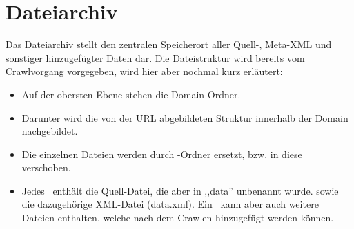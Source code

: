 \section{Dateiarchiv} \label{spec:filearchive}
Das Dateiarchiv stellt den zentralen Speicherort aller Quell-, Meta-XML und sonstiger
hinzugefügter Daten dar.
Die Dateistruktur wird bereits vom Crawlvorgang vorgegeben, wird hier aber nochmal kurz erläutert:
\begin{itemize}
	\item Auf der obersten Ebene stehen die Domain-Ordner.
	\item Darunter wird die von der URL abgebildeten Struktur
		innerhalb der Domain nachgebildet.
	\item Die einzelnen Dateien werden durch \arc-Ordner ersetzt, bzw. in diese verschoben.
	\item Jedes \arc\ enthält die Quell-Datei, 
		die aber in ,,data'' unbenannt wurde.
		sowie die dazugehörige XML-Datei (data.xml). 
		Ein \arc\ kann aber auch weitere Dateien enthalten, welche nach dem
		Crawlen hinzugefügt werden können.
\end{itemize}

